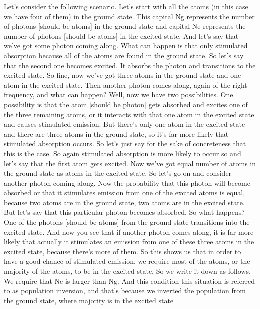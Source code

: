 Let's consider the following scenario. Let's start with all the atoms (in this case we have four of them) in the ground state. This capital Ng represents the number of photons [should be atoms] in the ground state and capital Ne represents the number of photons [should be atoms] in the excited state. And let's say that we've got some photon coming along. What can happen is that only stimulated absorption because all of the atoms are found in the ground state. So let's say that the second one becomes excited. It absorbs the photon and transitions to the excited state. So fine, now we've got three atoms in the ground state and one atom in the excited state. Then another photon comes along, again of the right frequency, and what can happen? Well, now we have two possibilities. One possibility is that the atom [should be photon] gets absorbed and excites one of the three remaining atoms, or it interacts with that one atom in the excited state and causes stimulated emission. But there's only one atom in the excited state and there are three atoms in the ground state, so it's far more likely that stimulated absorption occurs. So let's just say for the sake of concreteness that this is the case. So again stimulated absorption is more likely to occur so and let's say that the first atom gets excited. Now we've got equal number of atoms in the ground state as atoms in the excited state. So let's go on and consider another photon coming along. Now the probability that this photon will become absorbed or that it stimulates emission from one of the excited atoms is equal, because two atoms are in the ground state, two atoms are in the excited state. But let's say that this particular photon becomes absorbed. So what happens? One of the photons [should be atoms] from the ground state transitions into the excited state. And now you see that if another photon comes along, it is far more likely that actually it stimulates an emission from one of these three atoms in the excited state, because there's more of them. So this shows us that in order to have a good chance of stimulated emission, we require most of the atoms, or the majority of the atoms, to be in the excited state. So we write it down as follows. We require that Ne is larger than Ng. And this condition this situation is referred to as population inversion, and that's because we inverted the population from the ground state, where majority is in the excited state

